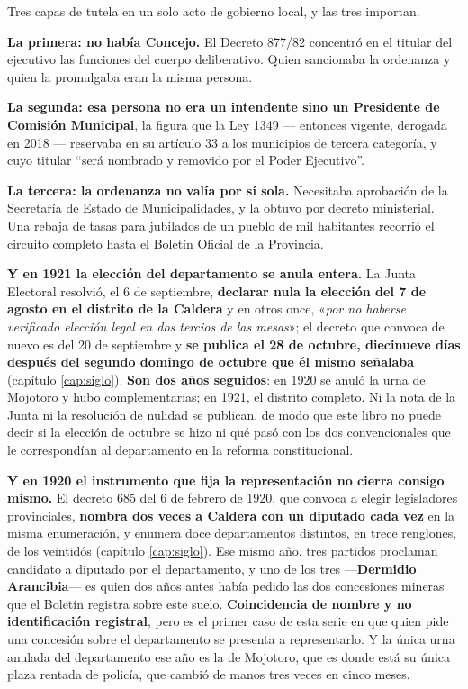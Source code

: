\begin{cautela}
Tres capas de tutela en un solo acto de gobierno local, y las tres importan.

\textbf{La primera: no había Concejo.} El Decreto 877/82 concentró en el titular del ejecutivo las funciones del cuerpo deliberativo. Quien sancionaba la ordenanza y quien la promulgaba eran la misma persona.

\textbf{La segunda: esa persona no era un intendente sino un Presidente de Comisión Municipal}, la figura que la Ley 1349 --- entonces vigente, derogada en 2018 --- reservaba en su artículo 33 a los municipios de tercera categoría, y cuyo titular ``será nombrado y removido por el Poder Ejecutivo''.

\textbf{La tercera: la ordenanza no valía por sí sola.} Necesitaba aprobación de la Secretaría de Estado de Municipalidades, y la obtuvo por decreto ministerial. Una rebaja de tasas para jubilados de un pueblo de mil habitantes recorrió el circuito completo hasta el Boletín Oficial de la Provincia.

\textbf{Y en 1921 la elección del departamento se anula entera.} La Junta Electoral resolvió, el 6 de septiembre, \textbf{declarar nula la elección del 7 de agosto en el distrito de la Caldera} y en otros once, «\textit{por no haberse verificado elección legal en dos tercios de las mesas}»; el decreto que convoca de nuevo es del 20 de septiembre y \textbf{se publica el 28 de octubre, diecinueve días después del segundo domingo de octubre que él mismo señalaba} (capítulo \ref{cap:siglo}). \textbf{Son dos años seguidos}: en 1920 se anuló la urna de Mojotoro y hubo complementarias; en 1921, el distrito completo. Ni la nota de la Junta ni la resolución de nulidad se publican, de modo que este libro no puede decir si la elección de octubre se hizo ni qué pasó con los dos convencionales que le correspondían al departamento en la reforma constitucional.

\textbf{Y en 1920 el instrumento que fija la representación no cierra consigo mismo.} El decreto 685 del 6 de febrero de 1920, que convoca a elegir legisladores provinciales, \textbf{nombra dos veces a Caldera con un diputado cada vez} en la misma enumeración, y enumera doce departamentos distintos, en trece renglones, de los veintidós (capítulo \ref{cap:siglo}). Ese mismo año, tres partidos proclaman candidato a diputado por el departamento, y uno de los tres ---\textbf{Dermidio Arancibia}--- es quien dos años antes había pedido las dos concesiones mineras que el Boletín registra sobre este suelo. \textbf{Coincidencia de nombre y no identificación registral}, pero es el primer caso de esta serie en que quien pide una concesión sobre el departamento se presenta a representarlo. Y la única urna anulada del departamento ese año es la de Mojotoro, que es donde está su única plaza rentada de policía, que cambió de manos tres veces en cinco meses.


\end{cautela}

